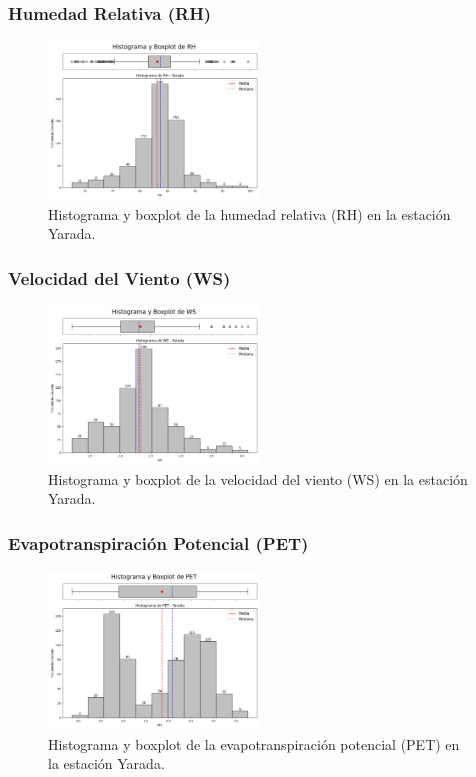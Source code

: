 \subsubsection*{Humedad Relativa (RH)}
\begin{figure}[H]
\centering
\includegraphics[width=0.5\textwidth]{resultados/por_estacion_meteorologica/Yarada/RH_histograma.png}
\caption{Histograma y boxplot de la humedad relativa (RH) en la estación Yarada.}
\label{fig:yarada_RH}
\end{figure}

\subsubsection*{Velocidad del Viento (WS)}
\begin{figure}[H]
\centering
\includegraphics[width=0.5\textwidth]{resultados/por_estacion_meteorologica/Yarada/WS_histograma.png}
\caption{Histograma y boxplot de la velocidad del viento (WS) en la estación Yarada.}
\label{fig:yarada_WS}
\end{figure}

\subsubsection*{Evapotranspiración Potencial (PET)}
\begin{figure}[H]
\centering
\includegraphics[width=0.5\textwidth]{resultados/por_estacion_meteorologica/Yarada/PET_histograma.png}
\caption{Histograma y boxplot de la evapotranspiración potencial (PET) en la estación Yarada.}
\label{fig:yarada_PET}
\end{figure}

